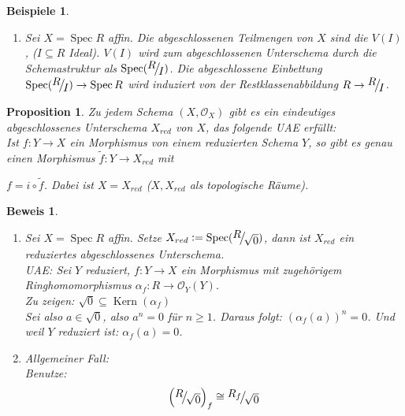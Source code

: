 \documentclass[a4paper,oneside]{scrbook}
\theoremstyle{break}
\newtheorem{Prop}[Def]{Proposition}
\newtheorem{Bsp}[Def]{Beispiele}
\theoremstyle{nonumberbreak}
\theoremstyle{nonumberplain}
\newtheorem{Bew}{Beweis}
\theoremstyle{break}
\newcommand{\defeqr}[0]{\mathrel{\mathop:}=}
\newcommand{\Spec}{%
	\ensuremath{\operatorname{Spec}}%
}
\DeclareMathOperator{\Kern}{Kern}
\newcommand{\FakRaum}[2]{
  \raisebox{0.7ex}{\ensuremath{#1}}
  \ensuremath{\mkern-3mu}\big/\ensuremath{\mkern-3mu}
  \raisebox{-0.6ex}{\ensuremath{#2}}}
\begin{document}
\begin{Bsp}
  \begin{enumerate}
  \item Sei $X=\Spec R$ affin. Die abgeschlossenen Teilmengen von $X$ sind die $V(I)$, ($I\subseteq R$ Ideal).
    $V(I)$ wird zum abgeschlossenen Unterschema durch die Schemastruktur als $\Spec (\FakRaum{R}{I})$.
    Die abgeschlossene Einbettung $\Spec (\FakRaum{R}{I})\to\Spec R$ wird induziert von der Restklassenabbildung $R\to\FakRaum{R}{I}$.
  \end{enumerate}
\end{Bsp}

\begin{Prop}
  \label{prop:6.4}
  Zu jedem Schema $(X,\mathcal O_X)$ gibt es ein eindeutiges abgeschlossenes Unterschema $X_{red}$ von $X$, das folgende UAE erfüllt: \\
  Ist $f:Y\to X$ ein Morphismus von einem reduzierten Schema $Y$, so gibt es genau einen Morphismus $\tilde{f}:Y\to X_{red}$ mit 
  \begin{center}
  \end{center}
  $f=i\circ\tilde{f}$. Dabei ist $X=X_{red}$ ($X,X_{red}$ als topologische Räume).
\end{Prop}

\begin{Bew}
  \begin{enumerate}
  \item[(1)]   Sei $X=\Spec R$ affin. Setze $X_{red}\defeqr\Spec(\FakRaum{R}{\sqrt{0}})$, dann ist $X_{red}$ 
    ein reduziertes abgeschlossenes Unterschema. \\
    UAE: Sei $Y$ reduziert, $f:Y\to X$ ein Morphismus mit zugehörigem Ringhomomorphismus $\alpha_f:R\to\mathcal O_Y(Y)$. \\
    Zu zeigen: $\sqrt{0}\subseteq\Kern(\alpha_f)$ \\
    Sei also $a\in\sqrt{0}$, also $a^n=0$ für $n\geq 1$. Daraus folgt: $(\alpha_f(a))^n=0$. Und weil $Y$ reduziert ist: $\alpha_f(a)=0$.
  \item[(2)] Allgemeiner Fall: \\
    Benutze:
    \begin{align*}
      \left( \FakRaum{R}{\sqrt{0}}\right)_f\cong\FakRaum{R_f}{\sqrt{0}}
    \end{align*}
  \end{enumerate}
\end{Bew}
\end{document}
